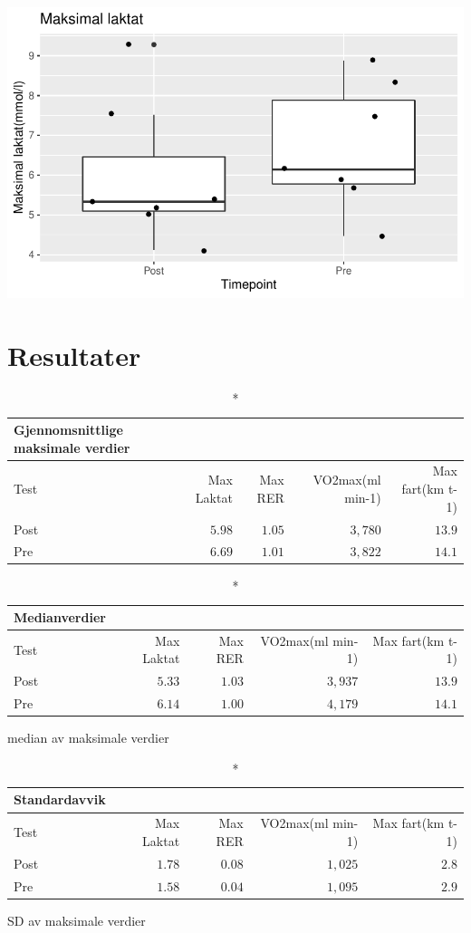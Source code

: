 \documentclass[
  letterpaper,
  DIV=11,
  numbers=noendperiod]{scrreprt}
\begin{document}
\includegraphics{./part1_files/figure-pdf/unnamed-chunk-2-1.pdf}


\hypertarget{resultater}{%
\chapter{Resultater}\label{resultater}}

\begin{longtable}{lrrrr}
\caption*{
{\large Gjennomsnittlige maksimale verdier}
} \\ 
\toprule
Test & Max Laktat & Max RER & VO2max(ml min-1) & Max fart(km t-1) \\ 
\midrule
Post & $5.98$ & $1.05$ & $3,780$ & $13.9$ \\ 
Pre & $6.69$ & $1.01$ & $3,822$ & $14.1$ \\ 
\bottomrule
\end{longtable}

\setlength{\LTpost}{0mm}
\begin{longtable}{lrrrr}
\caption*{
{\large Medianverdier}
} \\ 
\toprule
Test & Max Laktat & Max RER & VO2max(ml min-1) & Max fart(km t-1) \\ 
\midrule
Post & $5.33$ & $1.03$ & $3,937$ & $13.9$ \\ 
Pre & $6.14$ & $1.00$ & $4,179$ & $14.1$ \\ 
\bottomrule
\end{longtable}
\begin{minipage}{\linewidth}
median av maksimale verdier\\
\end{minipage}

\setlength{\LTpost}{0mm}
\begin{longtable}{lrrrr}
\caption*{
{\large Standardavvik}
} \\ 
\toprule
Test & Max Laktat & Max RER & VO2max(ml min-1) & Max fart(km t-1) \\ 
\midrule
Post & $1.78$ & $0.08$ & $1,025$ & $2.8$ \\ 
Pre & $1.58$ & $0.04$ & $1,095$ & $2.9$ \\ 
\bottomrule
\end{longtable}
\begin{minipage}{\linewidth}
SD av maksimale verdier\\
\end{minipage}
\end{document}
